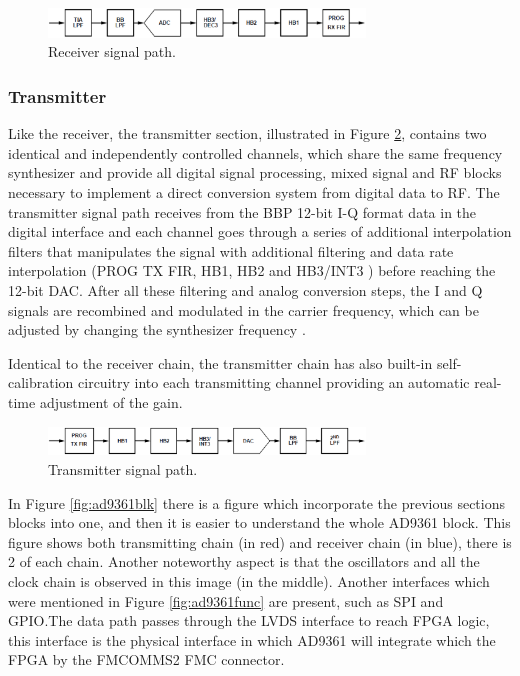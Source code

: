 \begin{figure}[htbp]
    \centering
    \includegraphics[width=0.75\textwidth]{./figures/rx_chain}
    \caption{ Receiver signal path.
    \label{fig:rxchain}}
\end{figure}


\subsubsection{Transmitter}

Like the receiver, the transmitter section, illustrated in Figure
\ref{fig:txchain}, contains two identical and independently controlled channels,
which share the same frequency synthesizer and provide all digital signal
processing, mixed signal and RF blocks necessary to implement a direct
conversion system from digital data to RF. The transmitter signal path receives
from the BBP 12-bit I-Q format data in the digital interface and each channel
goes through a series of additional interpolation filters that manipulates the
signal with additional filtering and data rate interpolation (PROG TX FIR, HB1,
HB2 and HB3/INT3 ) before reaching the 12-bit DAC. After all these filtering and
analog conversion steps, the I and Q signals are recombined and modulated in the
carrier frequency, which can be adjusted by changing the synthesizer frequency
\cite{ad:ad9361}.

Identical to the receiver chain, the transmitter chain has also built-in
self-calibration circuitry into each transmitting channel providing an automatic
real-time adjustment of the gain.

\begin{figure}[htbp]
    \centering
    \includegraphics[width=0.75\textwidth]{./figures/tx_chain}
    \caption{ Transmitter signal path.
    \label{fig:txchain}}
\end{figure}

In Figure \ref{fig:ad9361blk} there is a figure which incorporate the previous
sections blocks into one, and then it is easier to understand the whole AD9361
block. This figure shows both transmitting chain (in red) and receiver chain (in
blue), there is 2 of each chain. Another  noteworthy aspect is that the
oscillators and all the clock chain is observed in this image (in the middle).
Another interfaces which were mentioned in Figure \ref{fig:ad9361func} are
present, such as SPI and GPIO.The data path passes through the LVDS interface
to reach FPGA logic, this interface is the physical interface in which AD9361
will integrate which the FPGA by the FMCOMMS2 FMC connector.

